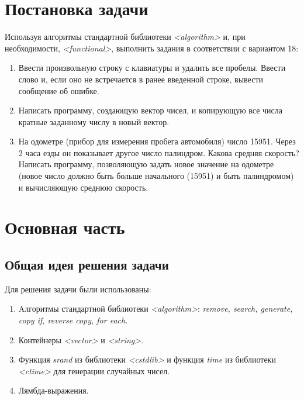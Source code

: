 \documentclass[a4paper,14pt]{article}
\begin{document}

\setcounter{page}{2} %

\renewcommand\contentsname{\centering {\normalsize Содержание}}
\tableofcontents
\newpage

\section*{Постановка задачи}

Используя алгоритмы стандартной библиотеки \textit{<algorithm>} и, при необходимости, \textit{<functional>}, выполнить задания в соответствии с вариантом 18:
\begin{enumerate}
	\item Ввести произвольную строку с клавиатуры и удалить все пробелы. Ввести слово и, если оно не встречается в ранее введенной строке, вывести сообщение об ошибке.
	\item Написать программу, создающую вектор чисел, и копирующую все числа кратные заданному числу в новый вектор.
	\item На одометре (прибор для измерения пробега автомобиля) число 15951. Через 2 часа езды он показывает другое число палиндром. Какова средняя скорость? Написать программу, позволяющую задать новое значение на одометре (новое число должно быть больше начального (15951) и быть палиндромом) и вычисляющую среднюю скорость.
\end{enumerate}

\newpage

\section{Основная часть}
\subsection{Общая идея решения задачи}
Для решения задачи были использованы:
\begin{enumerate}
	\item Aлгоритмы стандартной библиотеки \textit{<algorithm>}: \textit{remove, search, generate, copy if, reverse copy, for each}.
	\item Контейнеры \textit{<vector>} и \textit{<string>}.
	\item Функция \textit{srand} из библиотеки \textit{<cstdlib>} и функция \textit{time} из библиотеки \textit{<ctime>} для генерации случайных чисел.
	\item Лямбда-выражения.
\end{enumerate}
\end{document}
